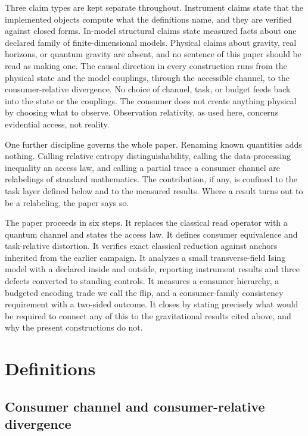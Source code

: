 \documentclass[aps,prd,reprint,nofootinbib,longbibliography]{revtex4-2}
\begin{document}
Three claim types are kept separate throughout.  Instrument claims state
that the implemented objects compute what the definitions name, and they are
verified against closed forms.  In-model structural claims state measured
facts about one declared family of finite-dimensional models.  Physical
claims about gravity, real horizons, or quantum gravity are absent, and no
sentence of this paper should be read as making one.  The causal direction
in every construction runs from the physical state and the model couplings,
through the accessible channel, to the consumer-relative divergence.  No
choice of channel, task, or budget feeds back into the state or the
couplings.  The consumer does not create anything physical by choosing what
to observe.  Observation relativity, as used here, concerns evidential
access, not reality.

One further discipline governs the whole paper.  Renaming known quantities
adds nothing.  Calling relative entropy distinguishability, calling the
data-processing inequality an access law, and calling a partial trace a
consumer channel are relabelings of standard mathematics.  The contribution,
if any, is confined to the task layer defined below and to the measured
results.  Where a result turns out to be a relabeling, the paper says so.

The paper proceeds in six steps.  It replaces the classical read operator
with a quantum channel and states the access law.  It defines consumer
equivalence and task-relative distortion.  It verifies exact classical
reduction against anchors inherited from the earlier campaign.  It analyzes
a small transverse-field Ising model with a declared inside and outside,
reporting instrument results and three defects converted to standing
controls.  It measures a consumer hierarchy, a budgeted encoding trade we
call the flip, and a consumer-family consistency requirement with a
two-sided outcome.  It closes by stating precisely what would be required to
connect any of this to the gravitational results cited above, and why the
present constructions do not.

\section{Definitions}
\label{sec:defs}

\subsection{Consumer channel and consumer-relative divergence}
\end{document}
